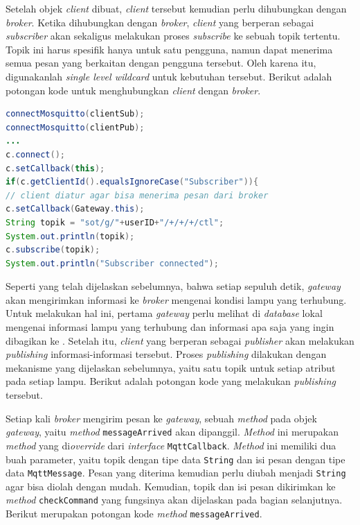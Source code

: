  Setelah objek \textit{client} dibuat, \textit{client} tersebut kemudian perlu dihubungkan dengan \textit{broker}. Ketika dihubungkan dengan \textit{broker}, \textit{client} yang berperan sebagai \textit{subscriber} akan sekaligus melakukan proses \textit{subscribe} ke sebuah topik tertentu. Topik ini harus spesifik hanya untuk satu pengguna, namun dapat menerima semua pesan yang berkaitan dengan pengguna tersebut. Oleh karena itu, digunakanlah \textit{single level wildcard} untuk kebutuhan tersebut. Berikut adalah potongan kode untuk menghubungkan \textit{client} dengan \textit{broker}.
 
 \begin{lstlisting}[language=Java,label=code:timer,caption=Menghubungkan \textit{client} dengan \textit{broker}]
connectMosquitto(clientSub);
connectMosquitto(clientPub);
...
c.connect();
c.setCallback(this);
if(c.getClientId().equalsIgnoreCase("Subscriber")){
// client diatur agar bisa menerima pesan dari broker
c.setCallback(Gateway.this);
String topik = "sot/g/"+userID+"/+/+/+/ctl";
System.out.println(topik);
c.subscribe(topik);
System.out.println("Subscriber connected");
 \end{lstlisting}

Seperti yang telah dijelaskan sebelumnya, bahwa setiap sepuluh detik, \textit{gateway} akan mengirimkan informasi ke \textit{broker} mengenai kondisi lampu yang terhubung. Untuk melakukan hal ini, pertama \textit{gateway} perlu melihat di \textit{database} lokal mengenai informasi lampu yang terhubung dan informasi apa saja yang ingin dibagikan ke \plat. Setelah itu, \textit{client} yang berperan sebagai \textit{publisher} akan melakukan \textit{publishing} informasi-informasi tersebut. Proses \textit{publishing} dilakukan dengan mekanisme yang dijelaskan sebelumnya, yaitu satu topik untuk setiap atribut pada setiap lampu. Berikut adalah potongan kode yang melakukan \textit{publishing} tersebut.



Setiap kali \textit{broker} mengirim pesan ke \textit{gateway}, sebuah \textit{method} pada objek \textit{gateway}, yaitu \textit{method} \texttt{messageArrived} akan dipanggil. \textit{Method} ini merupakan \textit{method} yang di\textit{override} dari \textit{interface} \texttt{MqttCallback}. \textit{Method} ini memiliki dua buah parameter, yaitu topik dengan tipe data \texttt{String} dan isi pesan dengan tipe data \texttt{MqttMessage}. Pesan yang diterima kemudian perlu diubah menjadi \texttt{String} agar bisa diolah dengan mudah. Kemudian, topik dan isi pesan dikirimkan ke \textit{method} \texttt{checkCommand} yang fungsinya akan dijelaskan pada bagian selanjutnya. Berikut merupakan potongan kode \textit{method} \texttt{messageArrived}.

